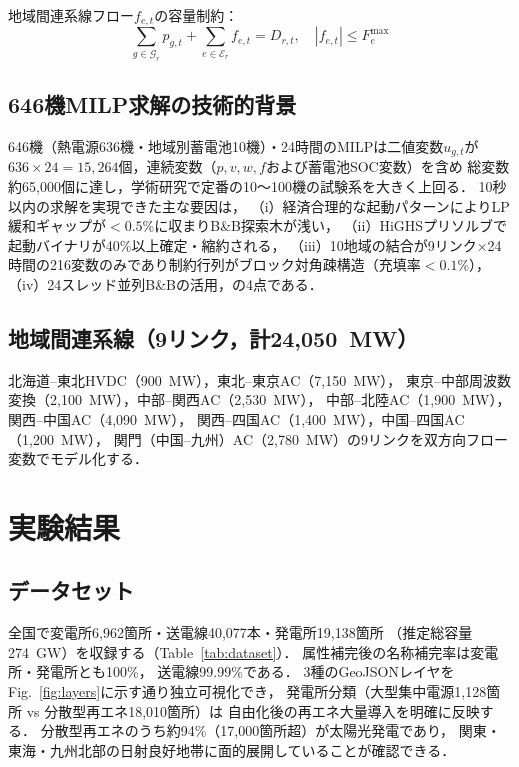 \documentclass[fleqn]{ieej}
\begin{document}
地域間連系線フロー$f_{e,t}$の容量制約：
\begin{equation}
  \sum_{g\in\mathcal{G}_r}p_{g,t}+\sum_{e\in\mathcal{E}_r}f_{e,t}=D_{r,t},\quad
  |f_{e,t}|\leq F_e^{\max}
  \label{eq:balance}
\end{equation}

\subsection{646機MILP求解の技術的背景}

646機（熱電源636機・地域別蓄電池10機）・24時間のMILPは二値変数$u_{g,t}$が
$636 \times 24 = 15{,}264$個，連続変数（$p,v,w,f$および蓄電池SOC変数）を含め
総変数約65{,}000個に達し，学術研究で定番の10〜100機の試験系\cite{carrion2006}を大きく上回る．
10秒以内の求解を実現できた主な要因は，
（i）経済合理的な起動パターンによりLP緩和ギャップが$<0.5$\%に収まりB\&B探索木が浅い，
（ii）HiGHSプリソルブで起動バイナリが40\%以上確定・縮約される，
（iii）10地域の結合が9リンク×24時間の216変数のみであり制約行列がブロック対角疎構造（充填率$<0.1$\%），
（iv）24スレッド並列B\&Bの活用，の4点である．

\subsection{地域間連系線（9リンク，計24,050~MW）}

北海道--東北HVDC（900~MW），東北--東京AC（7,150~MW），
東京--中部周波数変換（2,100~MW），中部--関西AC（2,530~MW），
中部--北陸AC（1,900~MW），関西--中国AC（4,090~MW），
関西--四国AC（1,400~MW），中国--四国AC（1,200~MW），
関門（中国--九州）AC（2,780~MW）の9リンクを双方向フロー変数でモデル化する．

\section{実験結果}

\subsection{データセット}

全国で変電所6,962箇所・送電線40,077本・発電所19,138箇所
（推定総容量274~GW）を収録する（Table~\ref{tab:dataset}）．
属性補完後の名称補完率は変電所・発電所とも100\%，
送電線99.99\%である．
3種のGeoJSONレイヤをFig.~\ref{fig:layers}に示す通り独立可視化でき，
発電所分類（大型集中電源1,128箇所 vs 分散型再エネ18,010箇所）は
自由化後の再エネ大量導入を明確に反映する．
分散型再エネのうち約94\%（17,000箇所超）が太陽光発電であり，
関東・東海・九州北部の日射良好地帯に面的展開していることが確認できる．
\end{document}

